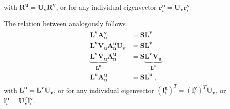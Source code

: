\documentclass[letterpaper,10pt,english]{jupyterBook}
\begin{document}
\sphinxAtStartPar
with \(\mathbf{R}^{\mathbf{u}} = \mathbf{U}_{\mathbf{v}} \mathbf{R}^\mathbf{v}\), or for any individual eigenvector \(\mathbf{r}^\mathbf{u}_i = \mathbf{U}_{\mathbf{v}} \mathbf{r}^{\mathbf{v}}_i\).

\sphinxAtStartPar
The relation between  analogously follows
\begin{equation*}
\begin{split}\begin{aligned}
  \mathbf{L}^\mathbf{v} \mathbf{A}^{\mathbf{v}}_{\mathbf{n}} & = \mathbf{S} \mathbf{L}^\mathbf{v} \\
  \mathbf{L}^\mathbf{v} \mathbf{V}_{\mathbf{u}} \mathbf{A}^{\mathbf{u}}_{\mathbf{n}} \mathbf{U}_{\mathbf{v}} & = \mathbf{S} \mathbf{L}^\mathbf{v} \\
  \underbrace{\mathbf{L}^\mathbf{v} \mathbf{V}_{\mathbf{u}}}_{\mathbf{L}^\mathbf{u}} \mathbf{A}^{\mathbf{u}}_{\mathbf{n}} & = \mathbf{S} \underbrace{\mathbf{L}^\mathbf{v} \mathbf{V}_{\mathbf{u}}}_{\mathbf{L}^\mathbf{u}}  \\
  \mathbf{L}^\mathbf{u} \mathbf{A}^{\mathbf{u}}_{\mathbf{n}} & = \mathbf{S} \mathbf{L}^\mathbf{u}  \ ,
\end{aligned}\end{split}
\end{equation*}
\sphinxAtStartPar
with \(\mathbf{L}^{\mathbf{u}} = \mathbf{L}^\mathbf{v} \mathbf{U}_{\mathbf{v}}\), or for any individual eigenvector \(\left( \mathbf{l}^\mathbf{u}_i \right)^T = \left( \mathbf{l}^\mathbf{v}_i \right)^T \mathbf{U}_\mathbf{v}\), or \(\mathbf{l}^\mathbf{u}_i = \mathbf{U}_\mathbf{v}^T \mathbf{l}^\mathbf{v}_i\).
\end{document}
